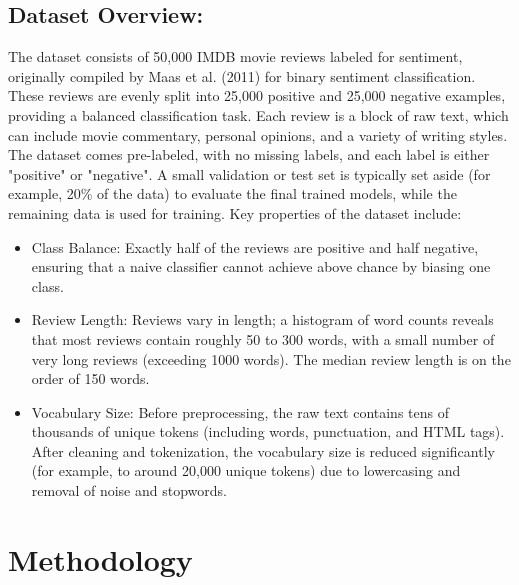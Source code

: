 \documentclass{article}
\begin{document}
\subsection{Dataset Overview:}
The dataset consists of 50,000 IMDB movie reviews labeled for sentiment, originally compiled by Maas et al. (2011) for binary sentiment classification. These reviews are evenly split into 25,000 positive and 25,000 negative examples, providing a balanced classification task. Each review is a block of raw text, which can include movie commentary, personal opinions, and a variety of writing styles. The dataset comes pre-labeled, with no missing labels, and each label is either "positive" or "negative". A small validation or test set is typically set aside (for example, 20\% of the data) to evaluate the final trained models, while the remaining data is used for training. Key properties of the dataset include:
\begin{itemize}
\item Class Balance: Exactly half of the reviews are positive and half negative, ensuring that a naive classifier cannot achieve above chance by biasing one class.
\item Review Length: Reviews vary in length; a histogram of word counts reveals that most reviews contain roughly 50 to 300 words, with a small number of very long reviews (exceeding 1000 words). The median review length is on the order of 150 words.
\item Vocabulary Size: Before preprocessing, the raw text contains tens of thousands of unique tokens (including words, punctuation, and HTML tags). After cleaning and tokenization, the vocabulary size is reduced significantly (for example, to around 20,000 unique tokens) due to lowercasing and removal of noise and stopwords.
\end{itemize}

\newpage

\section{Methodology}
\end{document}

